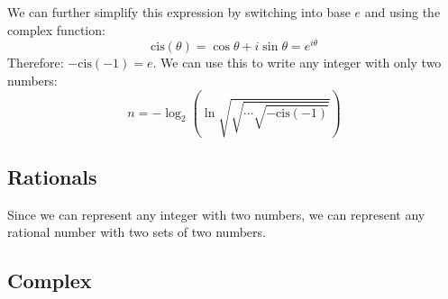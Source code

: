 We can further simplify this expression by switching into base $e$ and using the complex function:
\begin{equation}
    \mathrm{cis}(\theta) = \cos\theta + i\sin\theta = e^{i\theta}
\end{equation}
Therefore: $-\mathrm{cis}(-1)=e$. We can use this to write any integer with only two numbers:
\begin{equation}
    n = -\log_2\left( \ln \sqrt{\sqrt{\cdots\sqrt{-\mathrm{cis}(-1)}}}\right)
\end{equation}

\subsection{Rationals}
Since we can represent any integer with two numbers, we can represent any rational number with two sets of two numbers.

\subsection{Complex}
